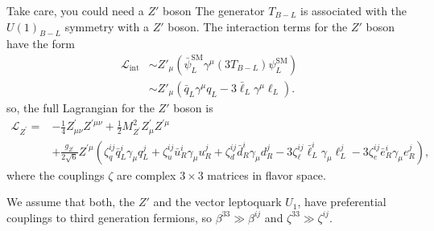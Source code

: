 \documentclass{../bredelebeamer}
\begin{document}
\begin{frame}{Take care, you could need a $Z'$ boson}
	The generator $T_{B-L}$ is associated with the $U(1)_{B-L}$ symmetry with a $Z'$ boson. The interaction terms for the $Z'$ boson have the form
	\begin{align*}
		\mathcal{L}_{\text{int}} &\sim Z'_\mu\left(\bar{\psi}_{L}^{\mathrm{SM}}\gamma^\mu (3T_{B-L}) \psi_{L}^{\mathrm{SM}}\right)\\
		&\sim Z'_\mu \left(\bar q_{L} \gamma^\mu q_{L} - 3 \bar \ell_L \gamma^\mu \ell_L\right).
	\end{align*}\pause
	so, the full Lagrangian for the $Z'$ boson is
	\begin{equation}
		\begin{aligned}
		\mathcal{L}_{Z^{\prime}}= & -\frac{1}{4} Z_{\mu \nu}^{\prime} Z^{\prime \mu \nu} +\frac{1}{2} M_{Z^{\prime}}^2 Z_\mu^{\prime} Z^{\prime \mu} \\
		& +\frac{g_{Z^{\prime}} }{2 \sqrt{6}} Z^{\prime \mu}\left(\zeta_q^{i j} \bar{q}_L^i \gamma_\mu q_L^j+\zeta_u^{i j} \bar{u}_R^i \gamma_\mu u_R^j+\zeta_d^{i j} \bar{d}_R^i \gamma_\mu d_R^j-3 \zeta_{\ell}^{i j} \bar{\ell}_L^i \gamma_\mu \ell_L^j-3 \zeta_e^{i j} \bar{e}_R^i \gamma_\mu e_R^j\right),
		\end{aligned}
	\end{equation}
	where the couplings $\zeta$ are complex $3\times 3$ matrices in flavor space.\pause

	\vfill
	We assume that both, the $Z'$ and the vector leptoquark $U_1$, have preferential couplings to third generation fermions, so $\beta^{33}\gg \beta^{ij}$ and $\zeta^{33}\gg \zeta^{ij}$.
\end{frame}
\end{document}
